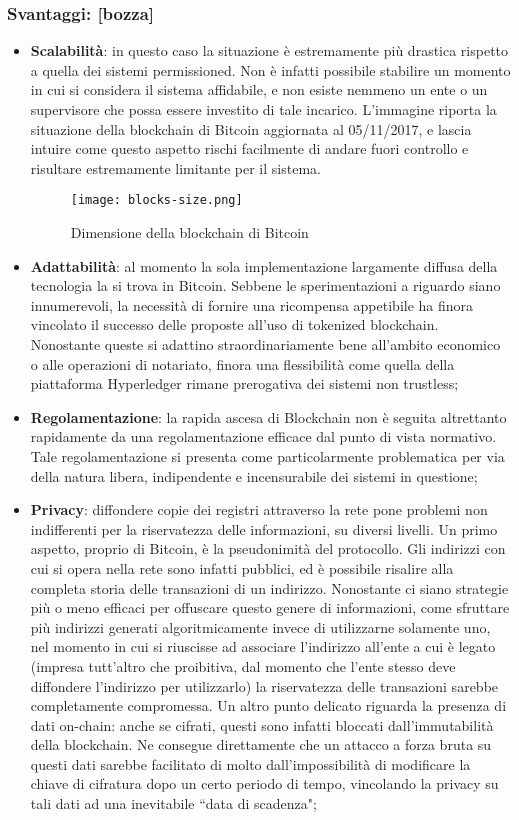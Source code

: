 		\subsubsection{Svantaggi: [bozza]}
			\begin{itemize}
				\item \textbf{Scalabilità}: in questo caso la situazione è estremamente più drastica rispetto a quella dei sistemi permissioned. Non è infatti possibile stabilire un momento in cui si considera il sistema affidabile, e non esiste nemmeno un ente o un supervisore che possa essere investito di tale incarico. L'immagine riporta la situazione della blockchain di Bitcoin aggiornata al 05/11/2017, e lascia intuire come questo aspetto rischi facilmente di andare fuori controllo e risultare estremamente limitante per il sistema.
				\begin{figure}[ht]
					\centering
					\texttt{[image: blocks-size.png]}
					\caption{Dimensione della blockchain di Bitcoin}
					\label{fig:blocks.size}
				\end{figure}
				\item \textbf{Adattabilità}: al momento la sola implementazione largamente diffusa della tecnologia la si trova in Bitcoin. Sebbene le sperimentazioni a riguardo siano innumerevoli, la necessità di fornire una ricompensa appetibile ha finora vincolato il successo delle proposte all'uso di tokenized blockchain. Nonostante queste si adattino straordinariamente bene all'ambito economico o alle operazioni di notariato, finora una flessibilità come quella della piattaforma Hyperledger rimane prerogativa dei sistemi non trustless;
				\item \textbf{Regolamentazione}: la rapida ascesa di Blockchain non è seguita altrettanto rapidamente da una regolamentazione efficace dal punto di vista normativo. Tale regolamentazione si presenta come particolarmente problematica per via della natura libera, indipendente e incensurabile dei sistemi in questione;
				\item \textbf{Privacy}: diffondere copie dei registri attraverso la rete pone problemi non indifferenti per la riservatezza delle informazioni, su diversi livelli. Un primo aspetto, proprio di Bitcoin, è la pseudonimità del protocollo. Gli indirizzi con cui si opera nella rete sono infatti pubblici, ed è possibile risalire alla completa storia delle transazioni di un indirizzo. Nonostante ci siano strategie più o meno efficaci per offuscare questo genere di informazioni, come sfruttare più indirizzi generati algoritmicamente invece di utilizzarne solamente uno, nel momento in cui si riuscisse ad associare l'indirizzo all'ente a cui è legato (impresa tutt'altro che proibitiva, dal momento che l'ente stesso deve diffondere l'indirizzo per utilizzarlo) la riservatezza delle transazioni sarebbe completamente compromessa. Un altro punto delicato riguarda la presenza di dati on-chain: anche se cifrati, questi sono infatti bloccati dall'immutabilità della blockchain. Ne consegue direttamente che un attacco a forza bruta su questi dati sarebbe facilitato di molto dall'impossibilità di modificare la chiave di cifratura dopo un certo periodo di tempo, vincolando la privacy su tali dati ad una inevitabile ``data di scadenza"; 

\end{itemize}
